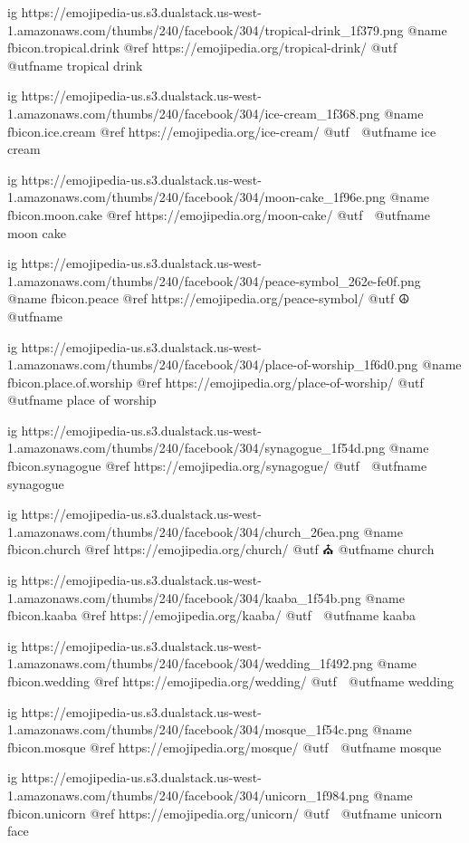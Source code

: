   ig https://emojipedia-us.s3.dualstack.us-west-1.amazonaws.com/thumbs/240/facebook/304/tropical-drink_1f379.png
  @name fbicon.tropical.drink
  @ref https://emojipedia.org/tropical-drink/
  @utf 🍹
  @utfname tropical drink

  ig https://emojipedia-us.s3.dualstack.us-west-1.amazonaws.com/thumbs/240/facebook/304/ice-cream_1f368.png
  @name fbicon.ice.cream
  @ref https://emojipedia.org/ice-cream/
  @utf 🍨
  @utfname ice cream

  ig https://emojipedia-us.s3.dualstack.us-west-1.amazonaws.com/thumbs/240/facebook/304/moon-cake_1f96e.png
  @name fbicon.moon.cake
  @ref https://emojipedia.org/moon-cake/
  @utf 🥮
  @utfname moon cake

  ig https://emojipedia-us.s3.dualstack.us-west-1.amazonaws.com/thumbs/240/facebook/304/peace-symbol_262e-fe0f.png
  @name fbicon.peace
  @ref https://emojipedia.org/peace-symbol/
  @utf ☮️
  @utfname



  ig https://emojipedia-us.s3.dualstack.us-west-1.amazonaws.com/thumbs/240/facebook/304/place-of-worship_1f6d0.png
  @name fbicon.place.of.worship
  @ref https://emojipedia.org/place-of-worship/
  @utf 🛐
  @utfname place of worship

  ig https://emojipedia-us.s3.dualstack.us-west-1.amazonaws.com/thumbs/240/facebook/304/synagogue_1f54d.png
  @name fbicon.synagogue
  @ref https://emojipedia.org/synagogue/
  @utf 🕍
  @utfname synagogue

  ig https://emojipedia-us.s3.dualstack.us-west-1.amazonaws.com/thumbs/240/facebook/304/church_26ea.png
  @name fbicon.church
  @ref https://emojipedia.org/church/
  @utf ⛪
  @utfname church

  ig https://emojipedia-us.s3.dualstack.us-west-1.amazonaws.com/thumbs/240/facebook/304/kaaba_1f54b.png
  @name fbicon.kaaba
  @ref https://emojipedia.org/kaaba/
  @utf 🕋
  @utfname kaaba

  ig https://emojipedia-us.s3.dualstack.us-west-1.amazonaws.com/thumbs/240/facebook/304/wedding_1f492.png
  @name fbicon.wedding
  @ref https://emojipedia.org/wedding/
  @utf 💒
  @utfname wedding

  ig https://emojipedia-us.s3.dualstack.us-west-1.amazonaws.com/thumbs/240/facebook/304/mosque_1f54c.png
  @name fbicon.mosque
  @ref https://emojipedia.org/mosque/
  @utf 🕌
  @utfname mosque

  ig https://emojipedia-us.s3.dualstack.us-west-1.amazonaws.com/thumbs/240/facebook/304/unicorn_1f984.png
  @name fbicon.unicorn
  @ref https://emojipedia.org/unicorn/
  @utf 🦄
  @utfname unicorn face

